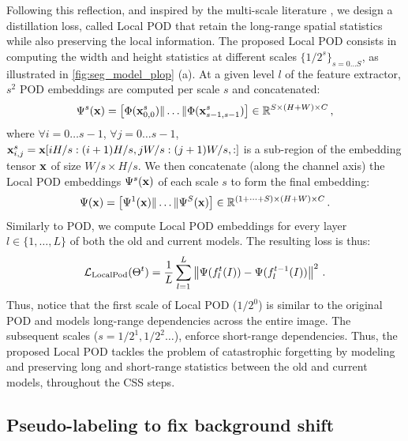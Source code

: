 Following this reflection, and inspired by the multi-scale literature
\citep{lazbnik2006spatial_pyramid_matching,he2014spatialpyramidpooling}, we design a distillation
loss, called Local POD that retain the long-range spatial statistics while also preserving the local
information. The proposed Local POD consists in computing the width and height statistics at
different scales $\{1/2^s\}_{s=0 \dots S}$, as illustrated in \autoref{fig:seg_model_plop} (a). At a
given level $l$ of the feature extractor, $s^2$ POD embeddings are computed per scale $s$ and
concatenated:
%
\begin{equation}
    \Psi^s(\mathbf{x}) = \left[ \Phi(\mathbf{x}^s_{0,0}) \| \dots \| \Phi(\mathbf{x}^s_{s-1,s-1}) \right] \in \mathbb{R}^{S \times (H + W) \times C}\,,
    \label{eq:seg_localpod_embedding1}
\end{equation}
%
where $\forall i = 0 \dots s-1$, $\forall j = 0 \dots s-1$, $\mathbf{x}^s_{i,j} = \mathbf{x}[i H/s:(i+1) H/s, j
        W/s:(j+1) W/s,:]$ is a sub-region of the embedding tensor $\mathbf{x}$ of size $W/s \times H/s$. We
then concatenate (along the channel axis) the Local POD embeddings $\Psi^s(\mathbf{x})$ of each
scale $s$ to form the final embedding:
%
\begin{equation}
    \Psi(\mathbf{x}) = \left[ \Psi^1(\mathbf{x}) \| \dots \| \Psi^S(\mathbf{x}) \right] \in \mathbb{R}^{(1 + \dots + S) \times (H + W) \times C}\,.
    \label{eq:seg_local_pod}
\end{equation}
%
Similarly to POD, we compute Local POD embeddings for every layer $l \in \{1, \dots, L\}$ of both
the old and current models. The resulting loss is thus:
%
\begin{equation}
    \mathcal{L}_{\scriptstyle\text{LocalPod}}(\Theta^t) = \frac{1}{L} \sum_{l = 1}^L \left\Vert  {\Psi}(f^t_l(I)) -  {\Psi}(f^{t-1}_l(I)) \right\Vert^2\,.
    \label{eq:seg_local_pod_loss}
\end{equation}
%
Thus, notice that the first scale of Local POD ($1/2^0$) is similar to the original POD and models
long-range dependencies across the entire image. The subsequent scales ($s=1/2^1, 1/2^2 \dots$),
enforce short-range dependencies. Thus, the proposed Local POD tackles the problem of catastrophic
forgetting by modeling and preserving long and short-range statistics between the old and current
models, throughout the \ac{CSS} steps.


\subsection{Pseudo-labeling to fix background shift}\label{sec:seg_hardpl}

